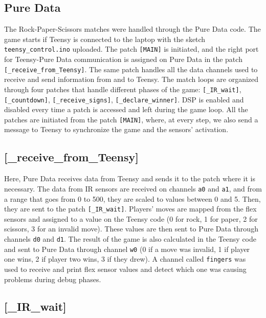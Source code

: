 \documentclass[11pt,a4paper]{report}
\begin{document}
\subsection*{Pure Data}

The Rock-Paper-Scissors matches were handled through the Pure Data code. The game starts if Teensy is connected to the laptop with the sketch \texttt{teensy\_control.ino} uploaded. The patch \texttt{[MAIN]} is initiated, and the right port for Teensy-Pure Data communication is assigned on Pure Data in the patch \texttt{[\_receive\_from\_Teensy]}. The same patch handles all the data channels used to receive and send information from and to Teensy. The match loops are organized through four patches that handle different phases of the game: \texttt{[\_IR\_wait]}, \texttt{[\_countdown]}, \texttt{[\_receive\_signs]}, \texttt{[\_declare\_winner]}. DSP is enabled and disabled every time a patch is accessed and left during the game loop. All the patches are initiated from the patch \texttt{[MAIN]}, where, at every step, we also send a message to Teensy to synchronize the game and the sensors' activation.

\subsection*{\textbf{[\_receive\_from\_Teensy]}}

Here, Pure Data receives data from Teensy and sends it to the patch where it is necessary. The data from IR sensors are received on channels \texttt{a0} and \texttt{a1}, and from a range that goes from 0 to 500, they are scaled to values between 0 and 5. Then, they are sent to the patch \texttt{[\_IR\_wait]}. Players' moves are mapped from the flex sensors and assigned to a value on the Teensy code (0 for rock, 1 for paper, 2 for scissors, 3 for an invalid move). These values are then sent to Pure Data through channels \texttt{d0} and \texttt{d1}. The result of the game is also calculated in the Teensy code and sent to Pure Data through channel \texttt{w0} (0 if a move was invalid, 1 if player one wins, 2 if player two wins, 3 if they drew). A channel called \texttt{fingers} was used to receive and print flex sensor values and detect which one was causing problems during debug phases.
\subsection*{\textbf{[\_IR\_wait]}}
\end{document}
